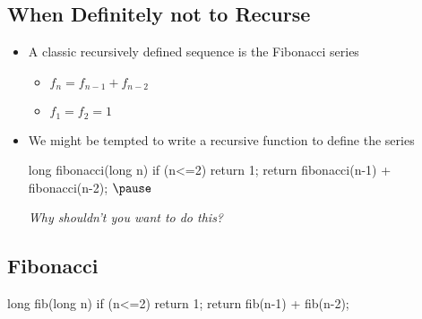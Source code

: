 \begin{slide}
\section[-1]{When Definitely not to Recurse}

\begin{PauseHighLight}
\begin{itemize}
\item A classic recursively defined sequence is the Fibonacci series
  \begin{itemize}
  \item $f_n = f_{n-1} + f_{n-2}$
  \item $f_1 = f_2 = 1$\pause
  \end{itemize}
\item We might be tempted to write a recursive function to define the
  series
  \begin{java}
    long fibonacci(long n)
    {
      if (n<=2)
         return 1;
      return fibonacci(n-1) + fibonacci(n-2);
    }$\pause$
  \end{java}
  \emph{Why shouldn't you want to do this?}\pause
\end{itemize}
\end{PauseHighLight}
\end{slide}


\begin{slide}
\section[-1]{Fibonacci}

\pb
\begin{java}
  long fib(long n)
  {
    if (n<=2)
    return 1;
    return fib(n-1) + fib(n-2);
  }
\end{java}\pause

\begin{center}
  \pause
\end{center}

\end{slide}



